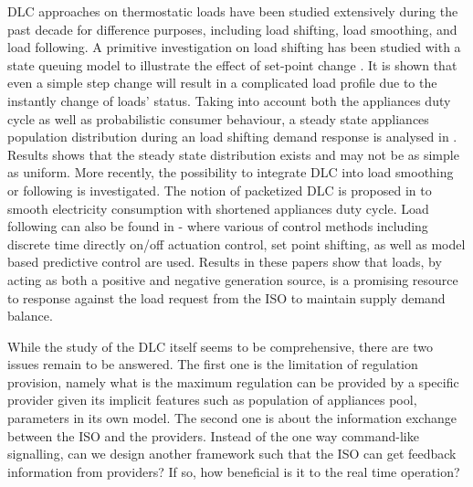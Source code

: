 \documentclass[journal]{IEEEtran}
\begin{document}
DLC approaches on thermostatic loads have been studied extensively during the past decade for difference purposes, including load shifting, load smoothing, and load following. A primitive investigation on load shifting has been studied with a state queuing model to illustrate the effect of set-point change \cite{chassin1}. It is shown that even a simple step change will result in a complicated load profile due to the instantly change of loads' status. Taking into account both the appliances duty cycle as well as probabilistic consumer behaviour, a steady state appliances population distribution during an load shifting demand response is analysed in \cite{chassin2}. Results shows that the steady state distribution exists and may not be as simple as uniform. More recently, the possibility to integrate DLC into load smoothing or following is investigated. The notion of packetized DLC is proposed in \cite{bowen} to smooth electricity consumption with shortened appliances duty cycle. Load following can also be found in \cite{duncan2}-\cite{duncan4} where various of control methods including discrete time directly on/off actuation control, set point shifting, as well as model based predictive control are used. Results in these papers show that loads, by acting as both a positive and negative generation source, is a promising resource to response against the load request from the ISO to maintain supply demand balance. 
 
While the study of the DLC itself seems to be comprehensive, there are two issues remain to be answered. The first one is the limitation of regulation provision, namely what is the maximum regulation can be provided by a specific provider given its implicit features such as population of appliances pool, parameters in its own model. The second one is about the information exchange between the ISO and the providers. Instead of the one way command-like signalling, can we design another framework such that the ISO can get feedback information from providers? If so, how beneficial is it to the real time operation?
\end{document}

